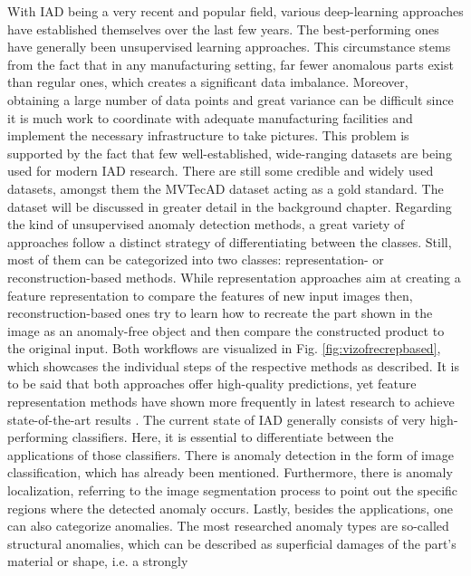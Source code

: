 With IAD being a very recent and popular field, various deep-learning approaches have established themselves over 
the last few years. The best-performing ones have generally been unsupervised learning approaches. This circumstance stems from the fact that 
in any manufacturing setting, far fewer anomalous parts exist than regular ones, which creates a significant data imbalance. 
Moreover, obtaining a large number of data points and great variance can be difficult since it is much work to 
coordinate with adequate manufacturing facilities and implement the necessary infrastructure to take pictures. This problem is supported 
by the fact that few well-established, wide-ranging datasets are being used for modern IAD research. There are still some credible and widely used 
datasets, amongst them the MVTecAD \cite{MVTEC_Bergmann_2021} dataset acting as a gold standard. The dataset will be discussed in greater detail 
in the background chapter. Regarding the kind of unsupervised anomaly detection methods, a great variety of approaches follow a 
distinct strategy of differentiating between the classes. Still, most of them can be categorized into two classes: representation- 
or reconstruction-based methods. While representation approaches aim at creating a feature representation to compare the features of new input images then, 
reconstruction-based ones try to learn how to recreate the part shown in the image as an anomaly-free object and then compare the constructed product to the original input. 
Both workflows are visualized in Fig. \ref{fig:vizofrecrepbased}, which showcases 
the individual steps of the respective methods as described. It is to be said that both approaches offer high-quality predictions, yet 
feature representation methods have shown more frequently in latest research to achieve state-of-the-art results \cite{liu2024deep}. %
\newline
The current state of IAD generally consists of very high-performing classifiers. Here, it is essential to differentiate between the 
applications of those classifiers. There is anomaly detection in the form of image classification, which has already been mentioned. 
Furthermore, there is anomaly localization, referring to the image segmentation process to point out the specific regions where 
the detected anomaly occurs. Lastly, besides the applications, one can also categorize anomalies. The most researched anomaly types 
are so-called structural anomalies, which can be described as superficial damages of the part's material or shape, i.e. a strongly 
